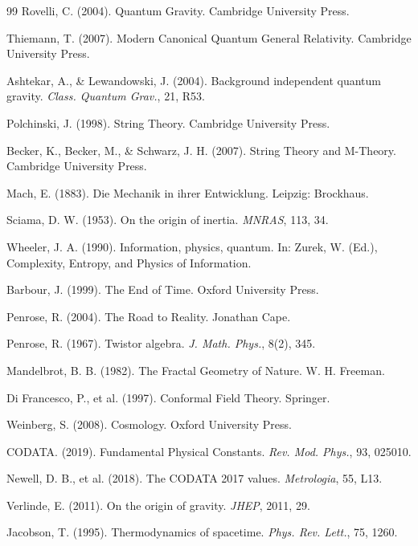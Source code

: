 \begin{thebibliography}{99}
		Rovelli, C. (2004). Quantum Gravity. Cambridge University Press.
		
		Thiemann, T. (2007). Modern Canonical Quantum General Relativity. Cambridge University Press.
		
		Ashtekar, A., \& Lewandowski, J. (2004). Background independent quantum gravity. \emph{Class. Quantum Grav.}, 21, R53.
		
		Polchinski, J. (1998). String Theory. Cambridge University Press.
		
		Becker, K., Becker, M., \& Schwarz, J. H. (2007). String Theory and M-Theory. Cambridge University Press.
		
		Mach, E. (1883). Die Mechanik in ihrer Entwicklung. Leipzig: Brockhaus.
		
		Sciama, D. W. (1953). On the origin of inertia. \emph{MNRAS}, 113, 34.
		
		Wheeler, J. A. (1990). Information, physics, quantum. In: Zurek, W. (Ed.), Complexity, Entropy, and Physics of Information.
		
		Barbour, J. (1999). The End of Time. Oxford University Press.
		
		Penrose, R. (2004). The Road to Reality. Jonathan Cape.
		
		Penrose, R. (1967). Twistor algebra. \emph{J. Math. Phys.}, 8(2), 345.
		
		Mandelbrot, B. B. (1982). The Fractal Geometry of Nature. W. H. Freeman.
		
		Di Francesco, P., et al. (1997). Conformal Field Theory. Springer.
		
		Weinberg, S. (2008). Cosmology. Oxford University Press.
		
		CODATA. (2019). Fundamental Physical Constants. \emph{Rev. Mod. Phys.}, 93, 025010.
		
		Newell, D. B., et al. (2018). The CODATA 2017 values. \emph{Metrologia}, 55, L13.
		
		Verlinde, E. (2011). On the origin of gravity. \emph{JHEP}, 2011, 29.
		
		Jacobson, T. (1995). Thermodynamics of spacetime. \emph{Phys. Rev. Lett.}, 75, 1260.
		

\end{thebibliography}
